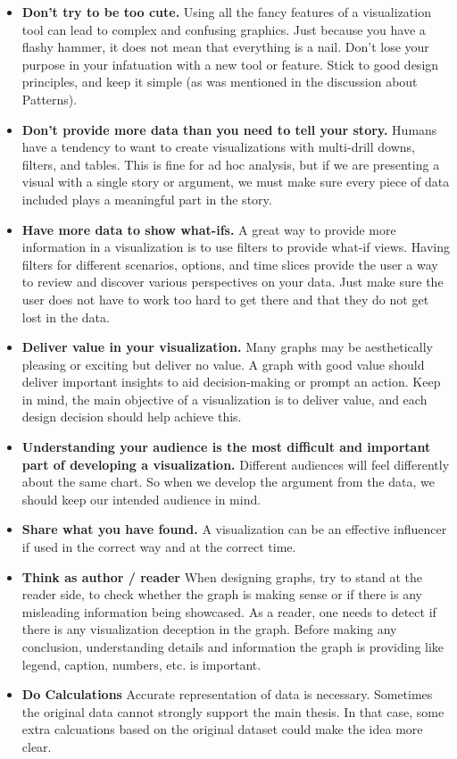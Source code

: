 \documentclass[]{book}
\begin{document}
\begin{itemize}
\item
  \textbf{Don't try to be too cute.} Using all the fancy features of a visualization tool can lead to complex and confusing graphics. Just because you have a flashy hammer, it does not mean that everything is a nail. Don't lose your purpose in your infatuation with a new tool or feature. Stick to good design principles, and keep it simple (as was mentioned in the discussion about Patterns).
\item
  \textbf{Don't provide more data than you need to tell your story.} Humans have a tendency to want to create visualizations with multi-drill downs, filters, and tables. This is fine for ad hoc analysis, but if we are presenting a visual with a single story or argument, we must make sure every piece of data included plays a meaningful part in the story.
\item
  \textbf{Have more data to show what-ifs.} A great way to provide more information in a visualization is to use filters to provide what-if views. Having filters for different scenarios, options, and time slices provide the user a way to review and discover various perspectives on your data. Just make sure the user does not have to work too hard to get there and that they do not get lost in the data.
\item
  \textbf{Deliver value in your visualization.} Many graphs may be aesthetically pleasing or exciting but deliver no value. A graph with good value should deliver important insights to aid decision-making or prompt an action. Keep in mind, the main objective of a visualization is to deliver value, and each design decision should help achieve this.
\item
  \textbf{Understanding your audience is the most difficult and important part of developing a visualization.} Different audiences will feel differently about the same chart. So when we develop the argument from the data, we should keep our intended audience in mind.
\item
  \textbf{Share what you have found.} A visualization can be an effective influencer if used in the correct way and at the correct time.
\item
  \textbf{Think as author / reader} When designing graphs, try to stand at the reader side, to check whether the graph is making sense or if there is any misleading information being showcased. As a reader, one needs to detect if there is any visualization deception in the graph. Before making any conclusion, understanding details and information the graph is providing like legend, caption, numbers, etc. is important.
\item
  \textbf{Do Calculations} Accurate representation of data is necessary. Sometimes the original data cannot strongly support the main thesis. In that case, some extra calcuations based on the original dataset could make the idea more clear.
\end{itemize}
\end{document}
